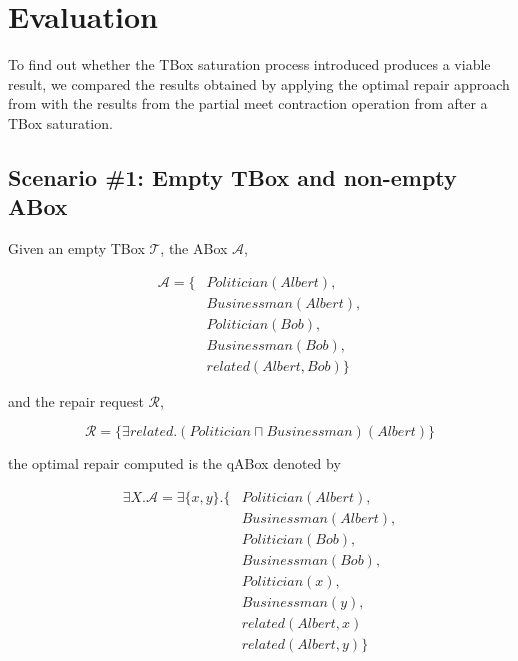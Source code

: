 
\chapter{Evaluation}
\label{chap:evaluation}

To find out whether the TBox saturation process introduced produces a viable result, we compared the results obtained by applying the optimal repair approach from \citep{Baader-CADE2021} with the results from the partial meet contraction operation from \citep{Matos2021} after a TBox saturation.

\section{Scenario \#1: Empty TBox and non-empty ABox}
\label{sec:scenario-1}

Given an empty TBox $\mathcal{T}$, the ABox $\mathcal{A}$,

\begin{equation*}
    \begin{aligned}
        \mathcal{A} = \{ & Politician(Albert),  \\
                         & Businessman(Albert), \\
                         & Politician(Bob),     \\
                         & Businessman(Bob),    \\
                         & related(Albert, Bob) \}
    \end{aligned}
\end{equation*}

and the repair request $\mathcal{R}$,

$$\mathcal{R} = \{\exists related.(Politician \sqcap Businessman)(Albert) \}$$

the optimal repair computed is the qABox denoted by

\begin{equation*}
    \begin{aligned}
        \exists X.\mathcal{A} = \exists \{ x, y \}.\{ & Politician(Albert),  \\
                                                      & Businessman(Albert), \\
                                                      & Politician(Bob),     \\
                                                      & Businessman(Bob),    \\ 
                                                      & Politician(x),       \\
                                                      & Businessman(y),      \\
                                                      & related(Albert, x)   \\
                                                      & related(Albert, y)   \}
    \end{aligned}
\end{equation*}

